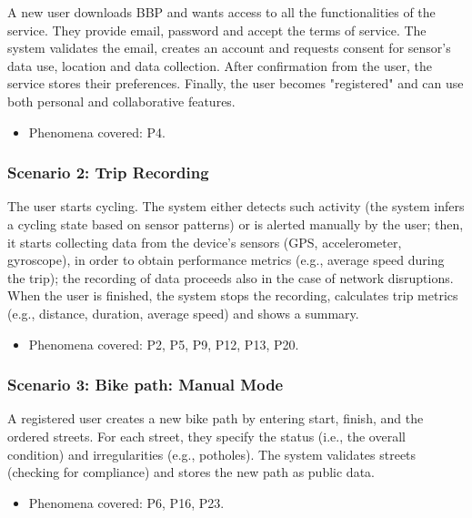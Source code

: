 \documentclass{Configuration_Files/PoliMi3i_thesis}
\begin{document}
    A new user downloads BBP and wants access to all the functionalities of the service. They provide email, password and accept the terms of service. The system validates the email, creates an account and requests consent for sensor's data use, location and data collection. After confirmation from the user, the service stores their preferences. Finally, the user becomes "registered" and can use both personal and collaborative features.
    
    \begin{itemize}\item{Phenomena covered: P4.}\end{itemize}
    
    \subsubsection*{Scenario 2: Trip Recording}
    
    The user starts cycling. The system either detects such activity (the system infers a cycling state based on sensor patterns) or is alerted manually by the user; then, it starts collecting data from the device's sensors (GPS, accelerometer, gyroscope), in order to obtain performance metrics (e.g., average speed during the trip); the recording of data proceeds also in the case of network disruptions. When the user is finished, the system stops the recording, calculates trip metrics (e.g., distance, duration, average speed) and shows a summary. 
    
    \begin{itemize}\item{Phenomena covered: P2, P5, P9, P12, P13, P20.}\end{itemize}
    
    \subsubsection*{Scenario 3: Bike path: Manual Mode}
    
    A registered user creates a new bike path by entering start, finish, and the ordered streets. For each street, they specify the status (i.e., the overall condition) and irregularities (e.g., potholes). The system validates streets (checking for compliance) and stores the new path as public data.
    
    \begin{itemize}\item{Phenomena covered: P6, P16, P23.}\end{itemize}
    
\end{document}
